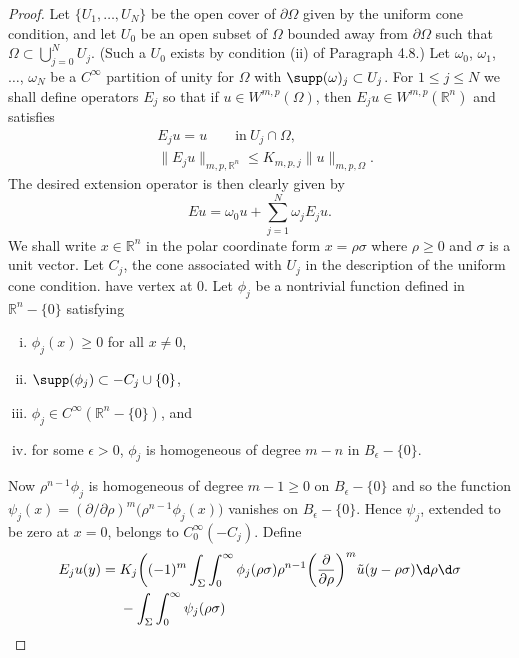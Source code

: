\begin{proof}
  Let $\{U_1,\ldots,U_N\}$ be the open cover of $\partial\Omega$
  given by the uniform cone condition, and let $U_0$ be an open subset
  of $\Omega$ bounded away from $\partial\Omega$ such that
  $\Omega\subset\bigcup_{j=0}^N U_j$. (Such a $U_0$ exists by condition (ii)
  of Paragraph 4.8.) Let $\omega_0$, $\omega_1$, $\ldots$, $\omega_N$
  be a $C^{\infty}$ partition of unity for $\Omega$ with $\supp(\omega)_j\subset U_j$.
  For $1\leq j\leq N$ we shall define operators $E_j$ so that if
  $u\in W^{m,p}(\Omega)$, then $E_j u\in W^{m,p}(\mathbb{R}^n)$ and satisfies
  \begin{align*}
    & E_j u = u \qquad \text{in}\ U_j\cap\Omega, \\
    & \|E_j u\|_{m,p,\mathbb{R}^n} \leq K_{m,p,j} \|u\|_{m,p,\Omega}.
  \end{align*}
  The desired extension operator is then clearly given by
  \[ Eu = \omega_0 u + \sum_{j=1}^N \omega_j E_j u. \]
  We shall write $x\in \mathbb{R}^n$ in the polar coordinate form
  $x = \rho\sigma$ where $\rho\geq 0$ and $\sigma$ is a unit vector.
  Let $C_j$, the cone associated with $U_j$ in the description of the
  uniform cone condition. have vertex at 0. Let $\phi_j$ be a nontrivial
  function defined in $\mathbb{R}^n - \{0\}$ satisfying
  \begin{enumerate}[(i)]
    \item $\phi_j(x)\geq 0$ for all $x\neq 0$,
    \item $\supp(\phi_j) \subset -C_j\cup\{0\}$,
    \item $\phi_j\in C^{\infty}(\mathbb{R}^n - \{0\})$, and
    \item for some $\epsilon>0$, $\phi_j$ is homogeneous of degree $m-n$ in $B_{\epsilon}-\{0\}$.
  \end{enumerate}
  Now $\rho^{n-1} \phi_j$ is homogeneous of degree $m-1\geq 0$
  on $B_{\epsilon}-\{0\}$ and so the function $\psi_j(x) = 
  (\partial/\partial\rho)^m \bigl(\rho^{n-1} \phi_j(x)\bigr)$
  vanishes on $B_{\epsilon} - \{0\}$. Hence $\psi_j$, extended to be
  zero at $x=0$, belongs to $C_0^\infty(-C_j)$. Define
  \begin{equation}\label{eq:5.26}
    \begin{aligned}
      E_j u(y) ={}
      & K_j \biggl((-1)^m \int_{\Sigma} \int_0^{\infty} \phi_j(\rho\sigma)
        \rho^{n-1} \biggl(\frac{\partial}{\partial\rho}\biggr)^m
        \tilde{u}(y-\rho\sigma) \d\rho\d\sigma \\
      & - \int_{\Sigma} \int_0^{\infty} \psi_j(\rho\sigma)

\end{aligned}
\end{equation}
\end{proof}
